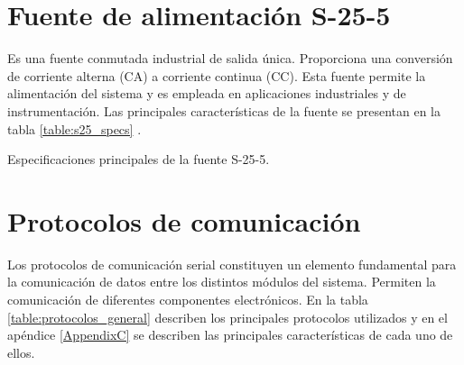 \section{Fuente de alimentación S-25-5}
Es una fuente conmutada industrial de salida única. Proporciona una conversión de corriente alterna (CA) a corriente continua (CC). Esta fuente permite la alimentación del sistema y es empleada en aplicaciones industriales y de instrumentación. Las principales características de la fuente se presentan en la tabla \ref{table:s25_specs} \cite{MeanWellS255}.

\begin{table}[H]
	\centering
	\small
	\caption{Especificaciones principales de la fuente S-25-5.}
	\label{table:s25_specs}
    
\end{table}

%
%



\section{Protocolos de comunicación}

Los protocolos de comunicación serial constituyen un elemento fundamental para la comunicación de datos entre los distintos módulos del sistema. Permiten la comunicación de diferentes componentes electrónicos. En la tabla \ref{table:protocolos_general} describen los principales protocolos utilizados y en el apéndice \ref{AppendixC} se describen las principales características de cada uno de ellos.



